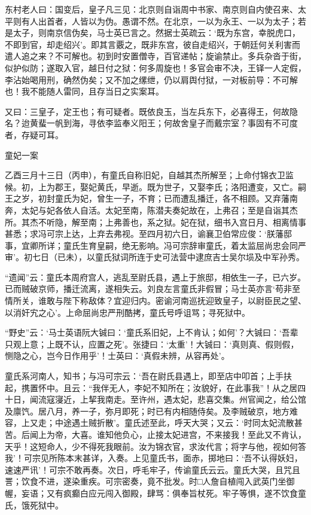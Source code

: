 \documentclass[]{article}
\begin{document}
东村老人曰：国变后，皇子凡三见：北京则自诣周中书家、南京则自内使召来、太平则有人出首者，人皆以为伪。愚谓不然。在北京，一以为永王、一以为太子；若是太子，则南京信伪矣，马士英已言之。然据士英疏云：`既为东宫，幸脱虎口，不即到官，却走绍兴'。即其言覈之，既非东宫，彼自走绍兴，于朝廷何关利害而遣人追之来？不可解也。初到时安置僧寺，百官递帖；旋谕禁止。多兵杂沓于街，似护似防；遂取入官，越日付之狱：何多周旋也！多官会审不决，王铎一人定假，李沾始喝用刑，确然伪矣；又不加之缧绁，仍以肩舆付狱，一对板前导：不可解也！我不能随人雷同，且存当日之实案耳。

又曰：三皇子，定王也；有可疑者。既依良玉，当左兵东下，必喜得王，何故隐名？迨黄蜚一帆到海，寻依李监奉义阳王；何故舍皇子而戴宗室？事固有不可度者，存疑可耳。

童妃一案

乙酉三月十三日（丙申），有童氏自称旧妃，自越其杰所解至；上命付锦衣卫监候。初，上为郡王，娶妃黄氏，早逝。既为世子，又娶李氏；洛阳遭变，又亡。嗣王之岁，初封童氏为妃，曾生一子，不育；已而遭乱播迁，各不相顾。又弃藩南奔，太妃与妃各依人自活。太妃至南，陈潜夫奏妃故在，上弗召；至是自诣其杰所。其杰不听隐，解至南；上弗善也，系之狱。妃在狱，细书入宫日月、相离情事甚悉；求冯可宗上达，上弃去弗视。至四月初六日，谕襄卫伯常应俊：`朕藩邸事，宜卿所详；童氏生育皇嗣，绝无影响。冯可宗辞审童氏，着太监屈尚忠会同严审'。初七日（已未），以童氏狱词所连于史可法营中逮庶吉士吴尔埙及中军孙秀。

``遗闻''云：童氏本周府宫人，逃乱至尉氏县，遇上于旅邸，相依生一子，已六岁。已而贼破京师，播迁流离，遂相失云。刘良左言童氏非假冒；马士英亦言`苟非至情所关，谁敢与陛下称敌体？宜迎归内。密谕河南巡抚迎致皇子，以尉臣民之望、以消奸宄之心'。上命屈尚忠严刑酷拷，童氏号呼诅骂；寻死狱中。

``野史''云：`马士英语阮大铖曰：`童氏系旧妃，上不肯认；如何'？大铖曰：`吾辈只观上意；上既不认，应置之死'。张捷曰：`太重'！大铖曰：`真则真、假则假，恻隐之心，岂今日作用乎'！士英曰：`真假未辨，从容再处'。

童氏系河南人，知书；与冯可宗云：`吾在尉氏县遇上，即至店中叩首；上手扶起，携置怀中。且云：``我伴无人，李妃不知所在；汝貌好，在此事我''！从之居四十日，闻流寇寖近，上挈我南走。至许州，遇太妃，悲喜交集。州官闻之，给公馆及廪饩。居八月，养一子，弥月即死；时已有内相随侍矣。及李贼破京，地方难容，上又走；中途遇土贼折散'。童氏述至此，呼天大哭；又云：`时同太妃流散甚苦。后闻上为帝，大喜。谁知他负心，止接太妃进宫，不来接我！至此又不肯认，天乎！这短命人，少不得死我眼前。汝为锦衣官，求汝代言；将字与他，视如何答我'！可宗见所陈本末甚详，入奏。上见童氏书，面赤，掷地曰：`吾不认得妖妇，速速严讯'！可宗不敢再奏。次日，呼毛牢子，传谕童氏云云。童氏大哭，且咒且詈；饮食不进，遂染重疾。可宗密奏，竟不批发。时□人詹自植闯入武英门坐御幄，妄语；又有疯癫白应元闯入御殿，肆骂：俱奉旨杖死。牢子等惧，遂不饮食童氏，饿死狱中。
\end{document}
